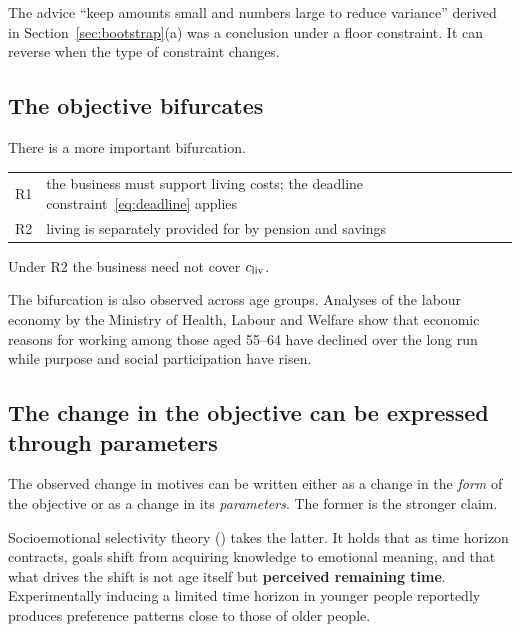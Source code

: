 The advice ``keep amounts small and numbers large to reduce variance'' derived in
Section~\ref{sec:bootstrap}(a) was a conclusion under a floor constraint. It can reverse when
the type of constraint changes.

\subsection{The objective bifurcates}

There is a more important bifurcation.

\begin{center}
\begin{tabularx}{\textwidth}{@{}lX@{}}
\toprule
R1 & the business must support living costs; the deadline constraint~\eqref{eq:deadline} applies \\
R2 & living is separately provided for by pension and savings \\
\bottomrule
\end{tabularx}
\label{tab:solo-r1-r2}
\end{center}

Under R2 the business need not cover $c_{\rm liv}$.

The bifurcation is also observed across age groups. Analyses of the labour economy by the
Ministry of Health, Labour and Welfare show that economic reasons for working among those
aged 55--64 have declined over the long run while purpose and social participation have
risen.

\subsection{The change in the objective can be expressed through parameters}
\label{sec:r2-sst}

The observed change in motives can be written either as a change in the \emph{form} of the
objective or as a change in its \emph{parameters}. The former is the stronger claim.

Socioemotional selectivity theory (\cite{carstensen1999}) takes the latter. It holds that as
time horizon contracts, goals shift from acquiring knowledge to emotional meaning, and that
what drives the shift is not age itself but \textbf{perceived remaining time}. Experimentally
inducing a limited time horizon in younger people reportedly produces preference patterns
close to those of older people.

